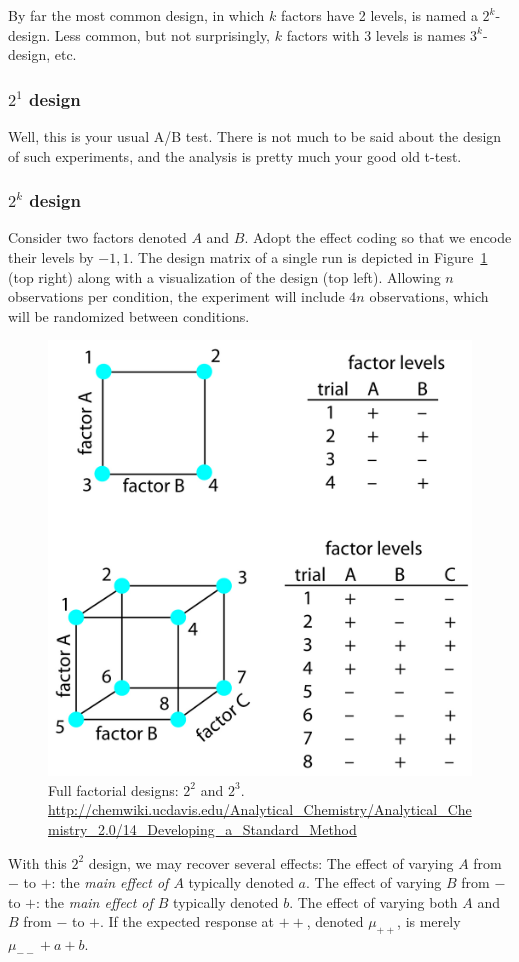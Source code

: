By far the most common design, in which $k$ factors have 2 levels, is named a $2^k$-design.
Less common, but not surprisingly, $k$ factors with 3 levels is names $3^k$-design, etc.




\subsubsection{$2^1$ design}
Well, this is your usual A/B test. 
There is not much to be said about the design of such experiments, and the analysis is pretty much your good old t-test.




\subsubsection{$2^k$ design}
Consider two factors denoted $A$ and $B$.
Adopt the effect coding so that we encode their levels by $-1,1$.
The design matrix of a single run is depicted in Figure~\ref{fig:full_factorial} (top right) along with a visualization of the design (top left).
Allowing $n$ observations per condition, the experiment will include $4n$ observations, which will be randomized between conditions.
\begin{figure}[ht]
\centering
\includegraphics[width=0.7\linewidth, height=0.3\textheight]{art/full_factorial}
\caption{Full factorial designs: $2^2$ and $2^3$. \newline \url{http://chemwiki.ucdavis.edu/Analytical_Chemistry/Analytical_Chemistry_2.0/14_Developing_a_Standard_Method}}
\label{fig:full_factorial}
\end{figure}
With this $2^2$ design, we may recover several effects:
The effect of varying $A$ from $-$ to $+$: the \emph{main effect of $A$} typically denoted $a$. 
The effect of varying $B$ from $-$ to $+$: the \emph{main effect of $B$} typically denoted $b$.  
The effect of varying both $A$ and $B$ from $-$ to $+$. 
If the expected response at $++$, denoted $\mu_{++}$, is merely $\mu_{--}+a+b$. 



